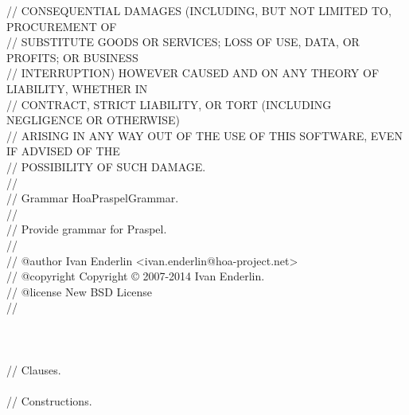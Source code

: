 \begin{bigbigpre}
// CONSEQUENTIAL DAMAGES (INCLUDING, BUT NOT LIMITED TO, PROCUREMENT OF \\
// SUBSTITUTE GOODS OR SERVICES; LOSS OF USE, DATA, OR PROFITS; OR BUSINESS \\
// INTERRUPTION) HOWEVER CAUSED AND ON ANY THEORY OF LIABILITY, WHETHER IN \\
// CONTRACT, STRICT LIABILITY, OR TORT (INCLUDING NEGLIGENCE OR OTHERWISE) \\
// ARISING IN ANY WAY OUT OF THE USE OF THIS SOFTWARE, EVEN IF ADVISED OF THE \\
// POSSIBILITY OF SUCH DAMAGE. \\
// \\
// Grammar \bslash{}Hoa\bslash{}Praspel\bslash{}Grammar. \\
// \\
// Provide grammar for Praspel. \\
// \\
// @author     Ivan Enderlin <ivan.enderlin@hoa-project.net> \\
// @copyright  Copyright © 2007-2014 Ivan Enderlin. \\
// @license    New BSD License \\
// \\
 \\
 \\
 \\
// Clauses. \\
 \\
// Constructions. \\

\end{bigbigpre}
